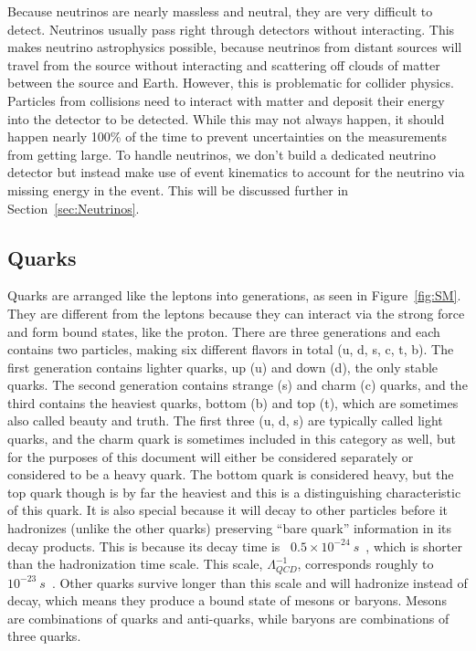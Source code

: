 Because neutrinos are nearly massless and neutral, they are very difficult to detect.  Neutrinos usually pass right through detectors without interacting.  This makes neutrino astrophysics possible, because neutrinos from distant sources will travel from the source without interacting and scattering off clouds of matter between the source and Earth.  However, this is problematic for collider physics.  Particles from collisions need to interact with matter and deposit their energy into the detector to be detected.  While this may not always happen, it should happen nearly 100\% of the time to prevent uncertainties on the measurements from getting large.  To handle neutrinos, we don't build a dedicated neutrino detector but instead make use of event kinematics to account for the neutrino via missing energy in the event.  This will be discussed further in Section~\ref{sec:Neutrinos}.  

\subsection{Quarks}
Quarks are arranged like the leptons into generations, as seen in Figure~\ref{fig:SM}.  They are different from the leptons because they can interact via the strong force and form bound states, like the proton.  There are three generations and each contains two particles, making six different flavors in total (u, d, s, c, t, b).  The first generation contains lighter quarks, up (u) and down (d), the only stable quarks.  The second generation contains strange (s) and charm (c) quarks, and the third contains the heaviest quarks, bottom (b) and top (t), which are sometimes also called beauty and truth.  The first three (u, d, s) are typically called light quarks, and the charm quark is sometimes included in this category as well, but for the purposes of this document will either be considered separately or considered to be a heavy quark.  The bottom quark is considered heavy, but the top quark though is by far the heaviest and this is a distinguishing characteristic of this quark.  It is also special because it will decay to other particles before it hadronizes (unlike the other quarks) preserving ``bare quark'' information in its decay products.  This is because its decay time is ~$0.5\times 10^{-24}~s$~\cite{PDGSummary}, which is shorter than the hadronization time scale.  This scale, $\Lambda^{-1}_{QCD}$, corresponds roughly to $10^{-23}~s$~\cite{TopHadronization}.  Other quarks survive longer than this scale and will hadronize instead of decay, which means they produce a bound state of mesons or baryons.  Mesons are combinations of quarks and anti-quarks, while baryons are combinations of three quarks.

